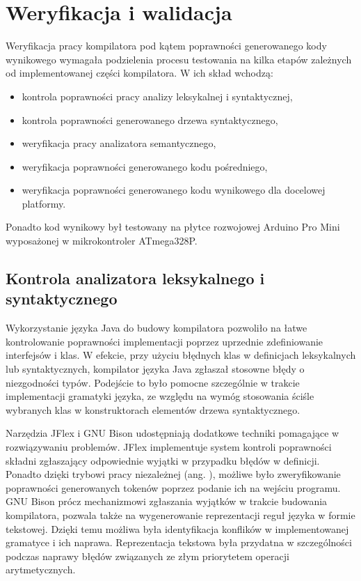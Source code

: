 \chapter{Weryfikacja i walidacja}
\label{ch:06}
Weryfikacja pracy kompilatora pod kątem poprawności generowanego kody wynikowego wymagała podzielenia procesu testowania na kilka etapów zależnych od implementowanej części kompilatora. W ich skład wchodzą:
\begin{itemize}
\item kontrola poprawności pracy analizy leksykalnej i syntaktycznej,
\item kontrola poprawności generowanego drzewa syntaktycznego,
\item weryfikacja pracy analizatora semantycznego,
\item weryfikacja poprawności generowanego kodu pośredniego,
\item weryfikacja poprawności generowanego kodu wynikowego dla docelowej platformy.
\end{itemize}
Ponadto kod wynikowy był testowany na płytce rozwojowej Arduino Pro Mini wyposażonej w mikrokontroler ATmega328P.

\section{Kontrola analizatora leksykalnego i syntaktycznego}
Wykorzystanie języka Java do budowy kompilatora pozwoliło na łatwe kontrolowanie poprawności implementacji poprzez uprzednie zdefiniowanie interfejsów i klas. W efekcie, przy użyciu błędnych klas w definicjach leksykalnych lub syntaktycznych, kompilator języka Java zgłaszał stosowne błędy o niezgodności typów. Podejście to było pomocne szczególnie w trakcie implementacji gramatyki języka, ze względu na wymóg stosowania ściśle wybranych klas w konstruktorach elementów drzewa syntaktycznego.

Narzędzia JFlex i GNU Bison udostępniają dodatkowe techniki pomagające w rozwiązywaniu problemów. JFlex implementuje system kontroli poprawności składni zgłaszający odpowiednie wyjątki w przypadku błędów w definicji. Ponadto dzięki trybowi pracy niezależnej (ang. ), możliwe było zweryfikowanie poprawności generowanych tokenów poprzez podanie ich na wejściu programu.
GNU Bison prócz mechanizmowi zgłaszania wyjątków w trakcie budowania kompilatora, pozwala także na wygenerowanie reprezentacji reguł języka w formie tekstowej. Dzięki temu możliwa była identyfikacja konflików w implementowanej gramatyce i ich naprawa. Reprezentacja tekstowa była przydatna w szczególności podczas naprawy błędów związanych ze złym priorytetem operacji arytmetycznych.

